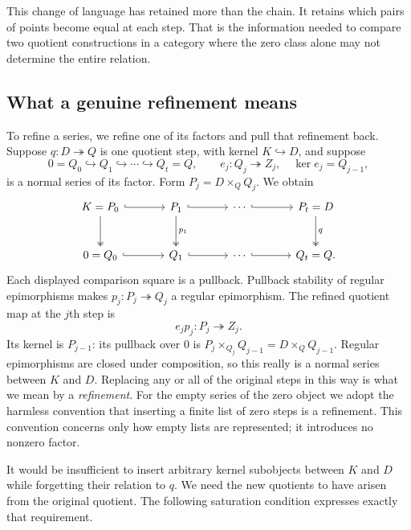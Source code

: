 This change of language has retained more than the chain.  It retains
which pairs of points become equal at each step.  That is the information
needed to compare two quotient constructions in a category where the zero
class alone may not determine the entire relation.

\subsection{What a genuine refinement means}

To refine a series, we refine one of its factors and pull that refinement
back.  Suppose $q:D\twoheadrightarrow Q$ is one quotient step, with kernel
$K\hookrightarrow D$, and suppose
\[
 0=Q_0\hookrightarrow Q_1\hookrightarrow\cdots\hookrightarrow Q_t=Q,
 \qquad e_j:Q_j\twoheadrightarrow Z_j,\quad\ker e_j=Q_{j-1},
\]
is a normal series of its factor.  Form $P_j=D\times_Q Q_j$.  We obtain
\[
\begin{tikzcd}[column sep=large,row sep=large]
K=P_0\arrow[r,hook]\arrow[d,two heads]
 &P_1\arrow[r,hook]\arrow[d,two heads,"p_1"]
 &\cdots\arrow[r,hook]&P_t=D\arrow[d,two heads,"q"]\\
0=Q_0\arrow[r,hook]&Q_1\arrow[r,hook]
 &\cdots\arrow[r,hook]&Q_t=Q .
\end{tikzcd}
\]
Each displayed comparison square is a pullback.  Pullback stability of
regular epimorphisms makes $p_j:P_j\twoheadrightarrow Q_j$ a regular
epimorphism.  The refined quotient map at the $j$th step is
\begin{equation}
\label{r:refined-map}
                  e_jp_j:P_j\twoheadrightarrow Z_j.
\end{equation}
Its kernel is $P_{j-1}$: its pullback over $0$ is
$P_j\times_{Q_j}Q_{j-1}=D\times_Q Q_{j-1}$.  Regular epimorphisms are
closed under composition, so this really is a normal series between $K$
and $D$.  Replacing any or all of the original steps in this way is what
we mean by a \emph{refinement}.
For the empty series of the zero object we adopt the harmless convention
that inserting a finite list of zero steps is a refinement.  This
convention concerns only how empty lists are represented; it introduces
no nonzero factor.

It would be insufficient to insert arbitrary kernel subobjects between
$K$ and $D$ while forgetting their relation to $q$.  We need the new
quotients to have arisen from the original quotient.  The following
saturation condition expresses exactly that requirement.


